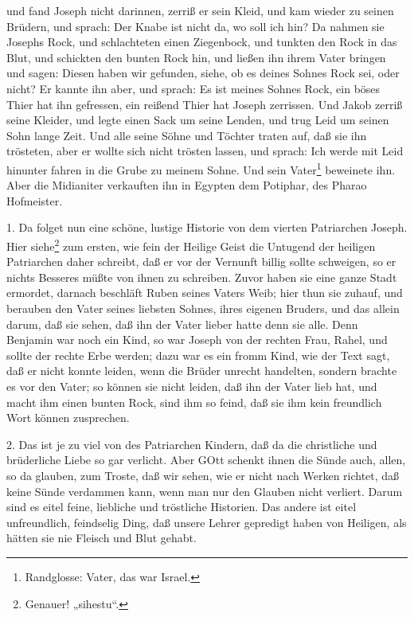 \begin{schriftzitat}
und fand Joseph nicht darinnen, zerriß er sein Kleid, und kam wieder zu seinen Brüdern, und sprach: Der Knabe ist nicht da, wo soll ich hin? Da nahmen sie Josephs Rock, und schlachteten einen Ziegenbock, und tunkten den Rock in das Blut, und schickten den bunten Rock hin, und ließen ihn ihrem Vater bringen und sagen: Diesen haben wir gefunden, siehe, ob es deines Sohnes Rock sei, oder nicht? Er kannte ihn aber, und sprach: Es ist meines Sohnes Rock, ein böses Thier hat ihn gefressen, ein reißend Thier hat Joseph zerrissen. Und Jakob zerriß seine Kleider, und legte einen Sack um seine Lenden, und trug Leid um seinen Sohn lange Zeit. Und alle seine Söhne und Töchter traten auf, daß sie ihn trösteten, aber er wollte sich nicht trösten lassen, und sprach: Ich werde mit Leid hinunter fahren in die Grube zu meinem Sohne. Und sein Vater\footnote{Randglosse: Vater, das war Israel.} beweinete ihn. Aber die Midianiter verkauften ihn in Egypten dem Potiphar, des Pharao Hofmeister.
\end{schriftzitat}

1. Da folget nun eine schöne, lustige Historie von dem vierten Patriarchen Joseph. Hier siehe\footnote{Genauer! „sihestu“.} zum ersten, wie fein der Heilige Geist die Untugend der heiligen Patriarchen daher schreibt,
daß er vor der Vernunft billig sollte schweigen, so er nichts Besseres müßte von ihnen zu schreiben. Zuvor haben sie eine ganze Stadt ermordet, darnach beschläft Ruben seines Vaters Weib; hier thun sie zuhauf, und berauben den Vater seines liebsten Sohnes, ihres eigenen Bruders, und das allein darum, daß sie sehen, daß ihn der Vater lieber hatte denn sie alle. Denn Benjamin war noch ein Kind, so war Joseph von der rechten Frau, Rahel, und sollte der rechte Erbe werden; dazu war es ein fromm Kind, wie der Text sagt, daß er nicht konnte leiden, wenn die Brüder unrecht handelten, sondern brachte es vor den Vater; so können sie nicht leiden, daß ihn der Vater lieb hat, und macht ihm einen bunten Rock, sind ihm so feind, daß sie ihm kein freundlich Wort können zusprechen.

2. Das ist je zu viel von des Patriarchen Kindern, daß da die christliche und brüderliche Liebe so gar verlicht. Aber GOtt schenkt ihnen die Sünde auch, allen, so da glauben, zum Troste, daß wir sehen, wie er nicht nach Werken richtet, daß keine Sünde verdammen kann, wenn man nur den Glauben nicht verliert. Darum sind es eitel feine, liebliche und tröstliche Historien. Das andere ist eitel unfreundlich, feindselig Ding, daß unsere Lehrer gepredigt haben von Heiligen, als hätten sie nie Fleisch und Blut gehabt.

